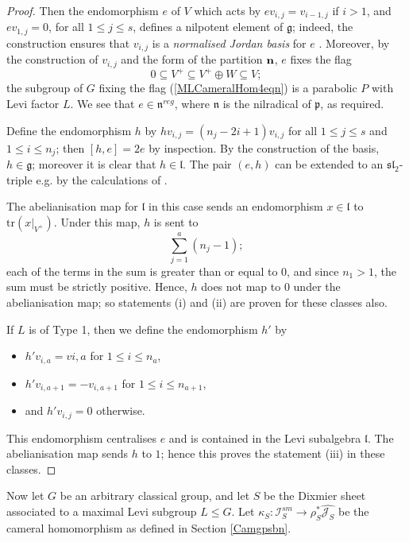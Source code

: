 \documentclass{amsart}
\theoremstyle{remark}
\numberwithin{theorem}{section}
\numberwithin{equation}{section}
\begin{document}
\begin{proof}
Then the endomorphism $e$ of $V$ which acts by $ev_{i,j} = v_{i-1,j}$ if $i >1$, and $ev_{1,j} = 0$, for all $1 \leq j \leq s$, defines a nilpotent element of $\mathfrak{g}$; indeed, the construction ensures that $v_{i,j}$ is a \emph{normalised Jordan basis} for $e$ \cite[5.1]{Hesselink}. Moreover, by the construction of $v_{i,j}$ and the form of the partition ${\bf n}$, $e$ fixes the flag
\begin{equation}\label{MLCameralHom4eqn}
    0 \subseteq V^+ \subseteq V^+ \oplus W \subseteq V;
\end{equation}
the subgroup of $G$ fixing the flag (\ref{MLCameralHom4eqn}) is a parabolic $P$ with Levi factor $L$. We see that $e \in \mathfrak{n}^{reg}$, where $\mathfrak{n}$ is the nilradical of $\mathfrak{p}$, as required.

Define the endomorphism $h$ by $hv_{i,j} = (n_j -2i+1)v_{i,j}$ for all $1 \leq j \leq s$ and $1 \leq i \leq n_j$; then $[h,e] = 2e$ by inspection. By the construction of the basis, $h \in \mathfrak{g}$; moreover it is clear that $h \in \mathfrak{l}$. The pair $(e,h)$ can be extended to an $\mathfrak{sl}_2$-triple e.g. by the calculations of \cite[Section 5.2]{CMcG}.

The abelianisation map for $\mathfrak{l}$ in this case sends an endomorphism $x \in \mathfrak{l}$ to $\text{tr}(x|_{V^+})$. Under this map, $h$ is sent to 
$$\sum_{j=1}^a (n_j-1);$$
each of the terms in the sum is greater than or equal to $0$, and since $n_1 > 1$, the sum must be strictly positive. Hence, $h$ does not map to $0$ under the abelianisation map; so statements (i) and (ii) are proven for these classes also.

If $L$ is of Type 1, then we define the endomorphism $h'$ by
\begin{itemize}
    \item $h'v_{i,a} = v{i,a}$ for $1 \leq i \leq n_a$,
    \item $h'v_{i,a+1}=-v_{i,a+1}$ for $1 \leq i \leq n_{a+1}$,
    \item and $h'v_{i,j} = 0$ otherwise.
\end{itemize}
   This endomorphism centralises $e$ and is contained in the Levi subalgebra $\mathfrak{l}$. The abelianisation map sends $h$ to $1$; hence this proves the statement (iii) in these classes.
\end{proof}

Now let $G$ be an arbitrary classical group, and let $S$ be the Dixmier sheet associated to a maximal Levi subgroup $L \leq G$. Let $\kappa_S:\mathcal I_S^{sm} \rightarrow \rho_S^*\hat{\mathcal J_S}$ be the cameral homomorphism as defined in Section \ref{Camgpsbn}.
\end{document}
